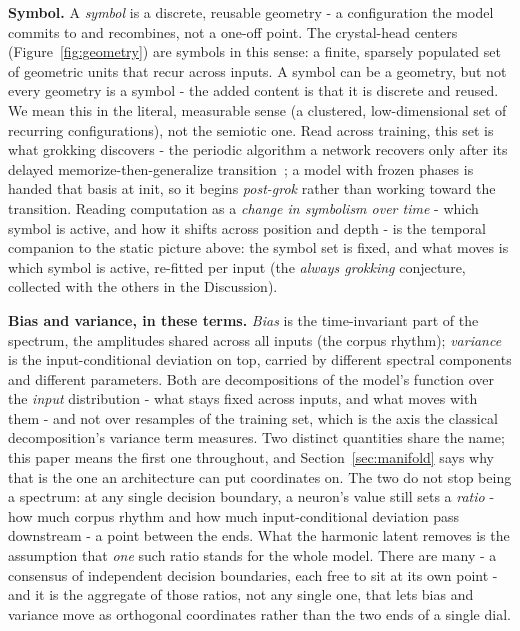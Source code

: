\textbf{Symbol.} A \textit{symbol} is a discrete, reusable geometry - a configuration the model commits to and recombines, not a one-off point. The crystal-head centers (Figure~\ref{fig:geometry}) are symbols in this sense: a finite, sparsely populated set of geometric units that recur across inputs. A symbol can be a geometry, but not every geometry is a symbol - the added content is that it is discrete and reused. We mean this in the literal, measurable sense (a clustered, low-dimensional set of recurring configurations), not the semiotic one. Read across training, this set is what grokking discovers - the periodic algorithm a network recovers only after its delayed memorize-then-generalize transition~\cite{nanda2023grokking,power2022grokking}; a model with frozen phases is handed that basis at init, so it begins \textit{post-grok} rather than working toward the transition. Reading computation as a \textit{change in symbolism over time} - which symbol is active, and how it shifts across position and depth - is the temporal companion to the static picture above: the symbol set is fixed, and what moves is which symbol is active, re-fitted per input (the \textit{always grokking} conjecture, collected with the others in the Discussion).

\textbf{Bias and variance, in these terms.} \textit{Bias} is the time-invariant part of the spectrum, the amplitudes shared across all inputs (the corpus rhythm); \textit{variance} is the input-conditional deviation on top, carried by different spectral components and different parameters. Both are decompositions of the model's function over the \textit{input} distribution - what stays fixed across inputs, and what moves with them - and not over resamples of the training set, which is the axis the classical decomposition's variance term measures. Two distinct quantities share the name; this paper means the first one throughout, and Section~\ref{sec:manifold} says why that is the one an architecture can put coordinates on. The two do not stop being a spectrum: at any single decision boundary, a neuron's value still sets a \textit{ratio} - how much corpus rhythm and how much input-conditional deviation pass downstream - a point between the ends. What the harmonic latent removes is the assumption that \textit{one} such ratio stands for the whole model. There are many - a consensus of independent decision boundaries, each free to sit at its own point - and it is the aggregate of those ratios, not any single one, that lets bias and variance move as orthogonal coordinates rather than the two ends of a single dial.

